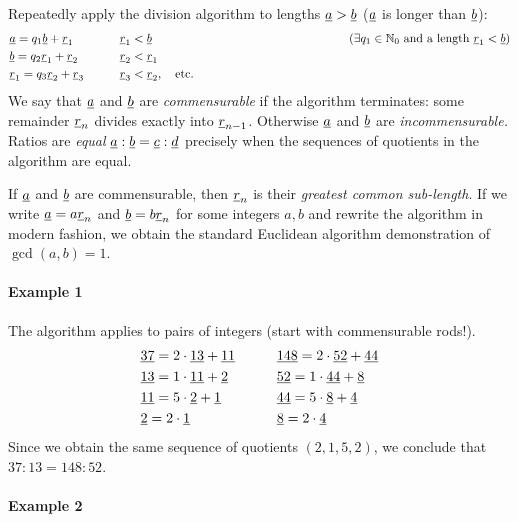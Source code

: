 \begin{defn*}{}{}
	Repeatedly apply the division algorithm to lengths $\underline a>\underline b$ ($\underline a$ is longer than $\underline b$): 
	\begin{align*}
		&\ul a =q_1\ul b+\ul r_1\qquad 
			&&\ul r_1<\ul b
			&&\hspace*{100pt}\tag{$\exists q_1\in\N_0$ and a length $\ul r_1<\ul b$}\\
		&\ul b=q_2\ul r_1+\ul r_2\qquad 
			&&\ul r_2<\ul r_1\\
		&\ul r_1=q_3\ul r_2+\ul r_3\qquad 
			&&\ul r_3<\ul r_2,\quad \text{etc.}
	\end{align*}
	We say that $\underline a$ and $\underline b$ are \emph{commensurable} if the algorithm terminates: some remainder $\underline r_n$ divides exactly into $\underline r_{n-1}$. Otherwise $\underline a$ and $\underline b$ are \emph{incommensurable.}\smallbreak
	Ratios are \emph{equal} $\underline a:\underline b=\underline c:\underline d$ precisely when the sequences of quotients in the algorithm are equal.
\end{defn*}


If $\underline a$ and $\underline b$ are commensurable, then $\underline r_n$ is their \emph{greatest common sub-length}. If we write $\underline a=a\underline r_n$ and $\underline b=b\underline r_n$ for some integers $a,b$ and rewrite the algorithm in modern fashion, we obtain the standard Euclidean algorithm demonstration of $\gcd(a,b)=1$.

\paragraph{Example 1}
The algorithm applies to pairs of integers (start with commensurable rods!). 
\begin{align*}
	&\underline{37}=2\cdot\underline{13}+\underline{11}\qquad 
		&&\underline{148}=2\cdot\underline{52}+\underline{44}\\
	&\underline{13}=1\cdot\underline{11}+\underline{2}\qquad 
		&&\underline{52}=1\cdot\underline{44}+\underline{8}\\
	&\underline{11}=5\cdot\underline{2}+\underline{1}\qquad 
		&&\underline{44}=5\cdot\underline{8}+\underline{4}\\
	&\underline{2}=2\cdot\underline{1}\qquad 
		&&\underline{8}=2\cdot\underline{4}
\end{align*}
Since we obtain the same sequence of quotients $(2,1,5,2)$, we conclude that $37:13=148:52$.


\paragraph{Example 2}\label{ex:theaetetus}

